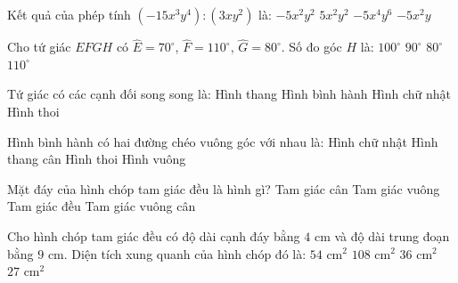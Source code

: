 \documentclass[12pt,a4paper]{article}
\begin{document}
\begin{ex}
Kết quả của phép tính $(-15x^3y^4) : (3xy^2)$ là:
\choice
{\True $-5x^2y^2$}
{$5x^2y^2$}
{$-5x^4y^6$}
{$-5x^2y$}
\end{ex}

\begin{ex}
Cho tứ giác $EFGH$ có $\widehat{E} = 70^\circ$, $\widehat{F} = 110^\circ$, $\widehat{G} = 80^\circ$. Số đo góc $H$ là:
\choice
{\True $100^\circ$}
{$90^\circ$}
{$80^\circ$}
{$110^\circ$}
\end{ex}

\begin{ex}
Tứ giác có các cạnh đối song song là:
\choice
{Hình thang}
{\True Hình bình hành}
{Hình chữ nhật}
{Hình thoi}
\end{ex}

\begin{ex}
Hình bình hành có hai đường chéo vuông góc với nhau là:
\choice
{Hình chữ nhật}
{Hình thang cân}
{\True Hình thoi}
{Hình vuông}
\end{ex}

\begin{ex}
Mặt đáy của hình chóp tam giác đều là hình gì?
\choice
{Tam giác cân}
{Tam giác vuông}
{\True Tam giác đều}
{Tam giác vuông cân}
\end{ex}

\begin{ex}
Cho hình chóp tam giác đều có độ dài cạnh đáy bằng $4\text{ cm}$ và độ dài trung đoạn bằng $9\text{ cm}$. Diện tích xung quanh của hình chóp đó là:
\choice
{\True $54\text{ cm}^2$}
{$108\text{ cm}^2$}
{$36\text{ cm}^2$}
{$27\text{ cm}^2$}
\end{ex}
\end{document}
